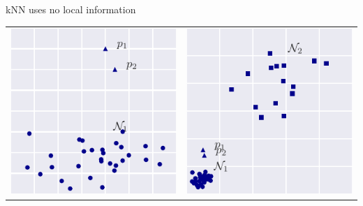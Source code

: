 \documentclass{beamer}
\begin{document}
  \begin{frame}{kNN uses no local information}
    
    \centering
    \begin{tabular}{c|c}
      \includegraphics[width=.45\textwidth]{figs/hard1_dist.pdf} &
      \includegraphics[width=.45\textwidth]{figs/hard2_dist.pdf}
    \end{tabular}

  \end{frame}
\end{document}
